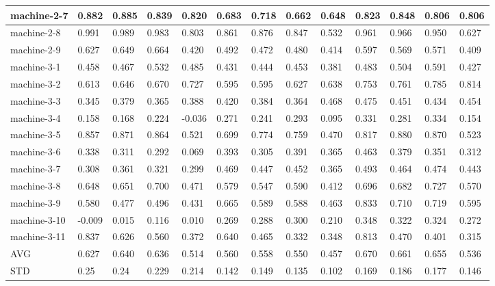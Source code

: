\begin{table}[]
{\begin{tabular}{|l||l|l|l|l||l|l|l|l||l|l|l|l|}
			\hline
			machine-2-7     & 0.882  & 0.885 & 0.839 & 0.820  & 0.683 & 0.718 & 0.662 & 0.648 & 0.823 & 0.848        & 0.806  & 0.806 \\ 
			\hline
			machine-2-8     & 0.991  & 0.989 & 0.983 & 0.803  & 0.861 & 0.876 & 0.847 & 0.532 & 0.961 & 0.966        & 0.950  & 0.627 \\ 
			\hline
			machine-2-9     & 0.627  & 0.649 & 0.664 & 0.420  & 0.492 & 0.472 & 0.480 & 0.414 & 0.597 & 0.569        & 0.571  & 0.409 \\ 
			\hline
			machine-3-1     & 0.458  & 0.467 & 0.532 & 0.485  & 0.431 & 0.444 & 0.453 & 0.381 & 0.483 & 0.504        & 0.591  & 0.427 \\ 
			\hline
			machine-3-2     & 0.613  & 0.646 & 0.670 & 0.727  & 0.595 & 0.595 & 0.627 & 0.638 & 0.753 & 0.761        & 0.785  & 0.814 \\ 
			\hline
			machine-3-3     & 0.345  & 0.379 & 0.365 & 0.388  & 0.420 & 0.384 & 0.364 & 0.468 & 0.475 & 0.451        & 0.434  & 0.454 \\ 
			\hline
			machine-3-4     & 0.158  & 0.168 & 0.224 & -0.036 & 0.271 & 0.241 & 0.293 & 0.095 & 0.331 & 0.281        & 0.334  & 0.154 \\ 
			\hline
			machine-3-5     & 0.857  & 0.871 & 0.864 & 0.521  & 0.699 & 0.774 & 0.759 & 0.470 & 0.817 & 0.880        & 0.870  & 0.523 \\ 
			\hline
			machine-3-6     & 0.338  & 0.311 & 0.292 & 0.069  & 0.393 & 0.305 & 0.391 & 0.365 & 0.463 & 0.379        & 0.351  & 0.312 \\ 
			\hline
			machine-3-7     & 0.308  & 0.361 & 0.321 & 0.299  & 0.469 & 0.447 & 0.452 & 0.365 & 0.493 & 0.464        & 0.474  & 0.443 \\ 
			\hline
			machine-3-8     & 0.648  & 0.651 & 0.700 & 0.471  & 0.579 & 0.547 & 0.590 & 0.412 & 0.696 & 0.682        & 0.727  & 0.570 \\ 
			\hline
			machine-3-9     & 0.580  & 0.477 & 0.496 & 0.431  & 0.665 & 0.589 & 0.588 & 0.463 & 0.833 & 0.710        & 0.719  & 0.595 \\ 
			\hline
			machine-3-10    & -0.009 & 0.015 & 0.116 & 0.010  & 0.269 & 0.288 & 0.300 & 0.210 & 0.348 & 0.322        & 0.324  & 0.272 \\ 
			\hline
			machine-3-11    & 0.837  & 0.626 & 0.560 & 0.372  & 0.640 & 0.465 & 0.332 & 0.348 & 0.813 & 0.470        & 0.401  & 0.315 \\ 
			\hline
			AVG             & 0.627  & 0.640 & 0.636 & 0.514  & 0.560 & 0.558 & 0.550 & 0.457 & 0.670 & 0.661        & 0.655  & 0.536 \\ 
			\hline
			STD             & 0.25   & 0.24  & 0.229 & 0.214  & 0.142 & 0.149 & 0.135 & 0.102 & 0.169 & 0.186        & 0.177  & 0.146 \\
			\hline
		\end{tabular}
	}
\end{table}

